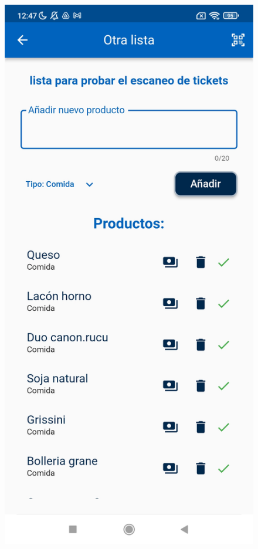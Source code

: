 \documentclass{article}
\begin{document}
\begin{figure}[h]
\begin{minipage}[h]{0.32\textwidth}
        \includegraphics[width=\textwidth]{imagenes/funcionamiento/ticket1_res1.jpg}

\end{minipage}
\end{figure}
\end{document}
